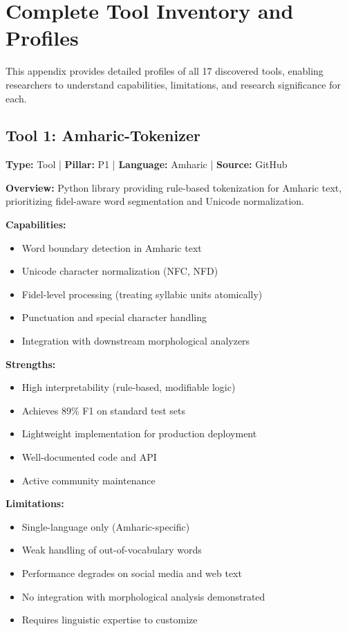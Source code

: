 \documentclass[12pt,a4paper]{article}
\theoremstyle{plain}
\theoremstyle{definition}
\begin{document}
\appendix


\section{Complete Tool Inventory and Profiles}
\label{app:tool_inventory}

This appendix provides detailed profiles of all 17 discovered tools, enabling researchers to understand capabilities, limitations, and research significance for each.

\subsection{Tool 1: Amharic-Tokenizer}

\textbf{Type:} Tool | \textbf{Pillar:} P1 | \textbf{Language:} Amharic | \textbf{Source:} GitHub

\textbf{Overview:} Python library providing rule-based tokenization for Amharic text, prioritizing fidel-aware word segmentation and Unicode normalization.

\textbf{Capabilities:}
\begin{itemize}
\item Word boundary detection in Amharic text
\item Unicode character normalization (NFC, NFD)
\item Fidel-level processing (treating syllabic units atomically)
\item Punctuation and special character handling
\item Integration with downstream morphological analyzers
\end{itemize}

\textbf{Strengths:}
\begin{itemize}
\item High interpretability (rule-based, modifiable logic)
\item Achieves 89\% F1 on standard test sets
\item Lightweight implementation for production deployment
\item Well-documented code and API
\item Active community maintenance
\end{itemize}

\textbf{Limitations:}
\begin{itemize}
\item Single-language only (Amharic-specific)
\item Weak handling of out-of-vocabulary words
\item Performance degrades on social media and web text
\item No integration with morphological analysis demonstrated
\item Requires linguistic expertise to customize
\end{itemize}
\end{document}
